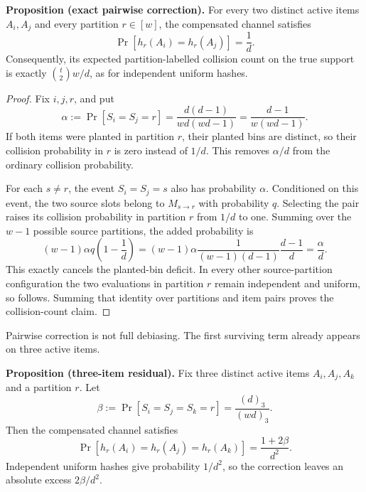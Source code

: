 \medskip
\noindent\textbf{Proposition (exact pairwise correction).}
For every two distinct active items $A_i,A_j$ and every partition $r\in[w]$,
the compensated channel satisfies
\begin{equation}\label{eq:rev-cuckoo-compensated-pair-marginal}
 \Pr[h_r(A_i)=h_r(A_j)]=\frac1d.
\end{equation}
Consequently, its expected partition-labelled collision count on the true
support is exactly $\binom{t}{2}w/d$, as for independent uniform hashes.

\begin{proof}
Fix $i,j,r$, and put
\[
 \alpha:=\Pr[S_i=S_j=r]
 =\frac{d(d-1)}{wd(wd-1)}
 =\frac{d-1}{w(wd-1)}.
\]
If both items were planted in partition $r$, their planted bins are distinct,
so their collision probability in $r$ is zero instead of $1/d$.  This removes
$\alpha/d$ from the ordinary collision probability.

For each $s\neq r$, the event $S_i=S_j=s$ also has probability $\alpha$.
Conditioned on this event, the two source slots belong to
$M_{s\mathbin\to r}$ with probability $q$.  Selecting the pair raises its
collision probability in partition $r$ from $1/d$ to one.  Summing over the
$w-1$ possible source partitions, the added probability is
\[
 (w-1)\alpha q\left(1-\frac1d\right)
 = (w-1)\alpha\frac{1}{(w-1)(d-1)}\frac{d-1}{d}
 =\frac{\alpha}{d}.
\]
This exactly cancels the planted-bin deficit.  In every other source-partition
configuration the two evaluations in partition $r$ remain independent and
uniform, so  follows.
Summing that identity over partitions and item pairs proves the collision-count
claim.
\end{proof}

Pairwise correction is not full debiasing.  The first surviving term already
appears on three active items.

\medskip
\noindent\textbf{Proposition (three-item residual).}
Fix three distinct active items $A_i,A_j,A_k$ and a partition $r$.  Let
\begin{equation}\label{eq:rev-cuckoo-compensated-beta}
 \beta:=\Pr[S_i=S_j=S_k=r]=\frac{(d)_3}{(wd)_3}.
\end{equation}
Then the compensated channel satisfies
\begin{equation}\label{eq:rev-cuckoo-compensated-triple-marginal}
 \Pr[h_r(A_i)=h_r(A_j)=h_r(A_k)]
 =\frac{1+2\beta}{d^2}.
\end{equation}
Independent uniform hashes give probability $1/d^2$, so the correction leaves
an absolute excess $2\beta/d^2$.

